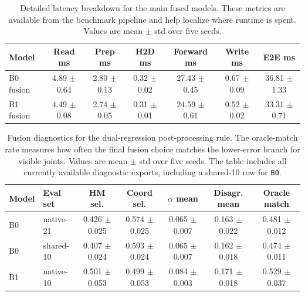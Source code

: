 \documentclass[10pt,letterpaper]{article}
\begin{document}
\begin{table}[H]
\centering
\footnotesize
\caption{Detailed latency breakdown for the main fused models. These metrics are available from the benchmark pipeline and help localize where runtime is spent. Values are mean $\pm$ std over five seeds.}
\label{tab:latency_breakdown}
\begin{tabular}{lcccccc}
\toprule
Model & Read ms & Prep ms & H2D ms & Forward ms & Write ms & E2E ms \\
\midrule
B0 fusion & 4.89 $\pm$ 0.64 & 2.80 $\pm$ 0.13 & 0.32 $\pm$ 0.02 & 27.43 $\pm$ 0.45 & 0.67 $\pm$ 0.09 & 36.81 $\pm$ 1.33 \\
B1 fusion & 4.49 $\pm$ 0.08 & 2.74 $\pm$ 0.05 & 0.31 $\pm$ 0.01 & 24.59 $\pm$ 0.61 & 0.52 $\pm$ 0.02 & 33.31 $\pm$ 0.71 \\
\bottomrule
\end{tabular}
\end{table}

\begin{table}[H]
\centering
\footnotesize
\caption{Fusion diagnostics for the dual-regression post-processing rule. The oracle-match rate measures how often the final fusion choice matches the lower-error branch for visible joints. Values are mean $\pm$ std over five seeds. The table includes all currently available diagnostic exports, including a shared-10 row for \texttt{B0}.}
\label{tab:fusion_diagnostics}
\begin{tabular}{llccccc}
\toprule
Model & Eval set & HM sel. & Coord sel. & $\alpha$ mean & Disagr. mean & Oracle match \\
\midrule
B0 & native-21 & 0.426 $\pm$ 0.025 & 0.574 $\pm$ 0.025 & 0.065 $\pm$ 0.007 & 0.163 $\pm$ 0.022 & 0.481 $\pm$ 0.012 \\
B0 & shared-10 & 0.407 $\pm$ 0.024 & 0.593 $\pm$ 0.024 & 0.065 $\pm$ 0.007 & 0.162 $\pm$ 0.018 & 0.474 $\pm$ 0.011 \\
B1 & native-10 & 0.501 $\pm$ 0.053 & 0.499 $\pm$ 0.053 & 0.084 $\pm$ 0.003 & 0.171 $\pm$ 0.018 & 0.529 $\pm$ 0.037 \\
\bottomrule
\end{tabular}
\end{table}
\end{document}
